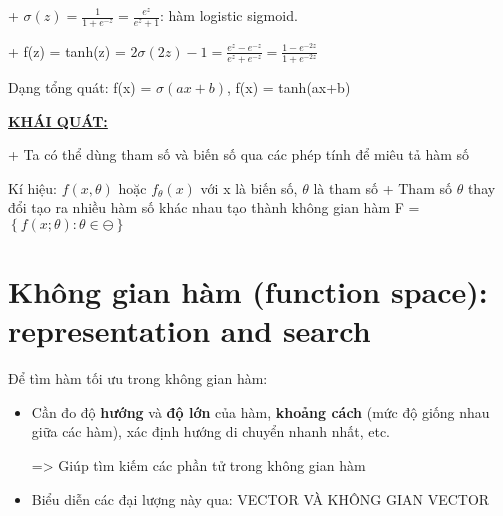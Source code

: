 \documentclass{article}
\begin{document}
\begin{itemize}
        + $\sigma (z)= \frac{1}{1+e^{-z}}  = \frac{e^{z}}{e^{z} +1}$: 
        hàm logistic sigmoid.
        
        +  f(z) = tanh(z) = $2\sigma(2z) - 1 = \frac{e^{z}-e^{-z}}{e^{z}+e^{-z}} =\frac{1-e^{-2z}}{1+e^{-2z}}$
   
Dạng tổng quát: f(x) = $\sigma(ax+b)$, f(x) = tanh(ax+b)

\underline{\textbf{KHÁI QUÁT:}}  

+ Ta có thể dùng tham số và biến số qua các phép tính để miêu tả hàm số

Kí hiệu: $f(x,\theta)$ hoặc $f_\theta(x)$ với x là biến số, $\theta$ là tham số
+ Tham số $\theta$ thay đổi tạo ra nhiều hàm số khác nhau tạo thành không gian hàm F = $\left \{f(x;\theta) : \theta \in \ominus \right \}$
\end{itemize}
\section{Không gian hàm (function space): representation and search}
Để tìm hàm tối ưu trong không gian hàm: 
\begin{itemize}
    \item Cần đo độ \textbf{hướng} và \textbf{độ lớn} của hàm, \textbf{khoảng cách} (mức độ giống nhau giữa các hàm), xác định hướng di chuyển nhanh nhất, etc.
    
    => Giúp tìm kiếm các phần tử trong không gian hàm
    \item Biểu diễn các đại lượng này qua: VECTOR VÀ KHÔNG GIAN VECTOR
\end{itemize}
\end{document}
